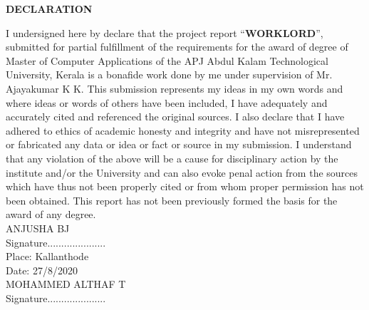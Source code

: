 \documentclass[a4paper,12pt]{report}
\begin{document}
\pagebreak


{\centering \bf \large
	DECLARATION\par
}

\vspace*{20pt}
{\normalsize I undersigned here by declare that the project report “{\bf WORKLORD}”, submitted for partial fulfillment of the requirements for the award of degree of Master
	of Computer Applications of the APJ Abdul Kalam Technological University, Kerala is a bonafide
	work done by me under supervision of Mr. Ajayakumar K K. This submission represents my ideas in my
	own words and where ideas or words of others have been included, I have adequately and accurately
	cited and referenced the original sources. I also declare that I have adhered to ethics of academic
	honesty and integrity and have not misrepresented or fabricated any data or idea or fact or source
	in my submission. I understand that any violation of the above will be a cause for disciplinary action
	by the institute and/or the University and can also evoke penal action from the sources which have
	thus not been properly cited or from whom proper permission has not been obtained. This report
	has not been previously formed the basis for the award of any degree. } \\


\hspace*{15pt} \hfill ANJUSHA BJ \\

\hspace*{0pt} \hfill Signature..................... \\
\vspace*{10pt} Place: Kallanthode \\
\vspace*{10pt} Date: 27/8/2020 \\ 
\hspace*{0pt} \hfill MOHAMMED ALTHAF T \\

\hspace*{0pt} \hfill Signature.....................
	
	
\pagebreak
\end{document}

